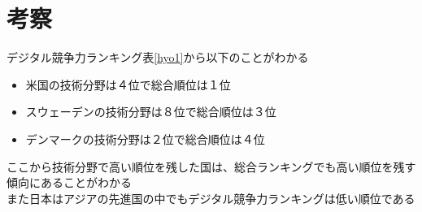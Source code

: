 \documentclass[a4paper,11pt,dvipdfmx]{ujarticle}
\begin{document}

\section{考察}

デジタル競争力ランキング表\ref{hyo1}から以下のことがわかる
\begin{itemize}
    \item 米国の技術分野は４位で総合順位は１位
    \item スウェーデンの技術分野は８位で総合順位は３位
    \item デンマークの技術分野は２位で総合順位は４位
\end{itemize} 
ここから技術分野で高い順位を残した国は、総合ランキングでも高い順位を残す傾向にあることがわかる \\
また日本はアジアの先進国の中でもデジタル競争力ランキングは低い順位である

%

%


\end{document}
